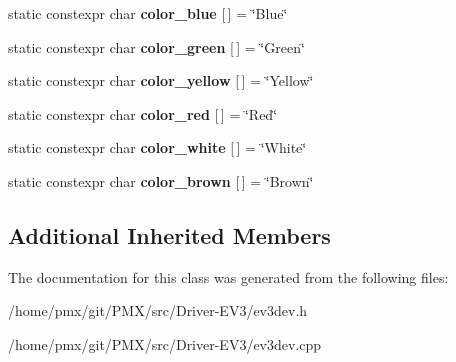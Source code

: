 \begin{DoxyCompactItemize}
static constexpr char {\bfseries color\+\_\+blue} \mbox{[}$\,$\mbox{]} = \char`\"{}Blue\char`\"{}
\item 
\mbox{\label{classev3dev_1_1color__sensor_a9fc8bc11a79cc8085e3c7ec9bd632cee}} 
static constexpr char {\bfseries color\+\_\+green} \mbox{[}$\,$\mbox{]} = \char`\"{}Green\char`\"{}
\item 
\mbox{\label{classev3dev_1_1color__sensor_a5eacead5bc5083f308315e3ebe339d31}} 
static constexpr char {\bfseries color\+\_\+yellow} \mbox{[}$\,$\mbox{]} = \char`\"{}Yellow\char`\"{}
\item 
\mbox{\label{classev3dev_1_1color__sensor_ab0f10bf9144cf77664ba831eca61ee2e}} 
static constexpr char {\bfseries color\+\_\+red} \mbox{[}$\,$\mbox{]} = \char`\"{}Red\char`\"{}
\item 
\mbox{\label{classev3dev_1_1color__sensor_a191c929729184e6606f0c1f6ebef24cc}} 
static constexpr char {\bfseries color\+\_\+white} \mbox{[}$\,$\mbox{]} = \char`\"{}White\char`\"{}
\item 
\mbox{\label{classev3dev_1_1color__sensor_a96be15d3a479f94ee39059caa37bc096}} 
static constexpr char {\bfseries color\+\_\+brown} \mbox{[}$\,$\mbox{]} = \char`\"{}Brown\char`\"{}
\end{DoxyCompactItemize}
\subsection*{Additional Inherited Members}


The documentation for this class was generated from the following files\+:\begin{DoxyCompactItemize}
\item 
/home/pmx/git/\+P\+M\+X/src/\+Driver-\/\+E\+V3/ev3dev.\+h\item 
/home/pmx/git/\+P\+M\+X/src/\+Driver-\/\+E\+V3/ev3dev.\+cpp\end{DoxyCompactItemize}
